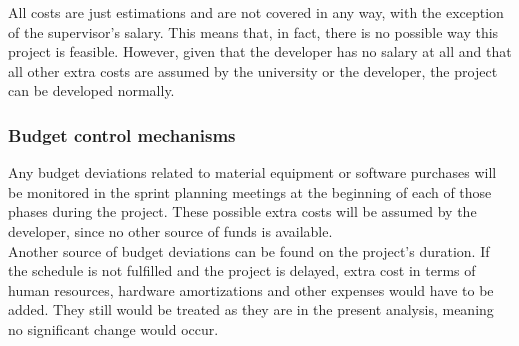 All costs are just estimations and are not covered in any way, with the exception of the supervisor’s salary. This means that, in fact, there is no possible way this project is feasible. However, given that the developer has no salary at all and that all other extra costs are assumed by the university or the developer, the project can be developed normally.

\subsubsection{Budget control mechanisms}

Any budget deviations related to material equipment or software purchases will be monitored in the sprint planning meetings at the beginning of each of those phases during the project. These possible extra costs will be assumed by the developer, since no other source of funds is available.\\

Another source of budget deviations can be found on the project’s duration. If the schedule is not fulfilled and the project is delayed, extra cost in terms of human resources, hardware amortizations and other expenses would have to be added. They still would be treated as they are in the present analysis, meaning no significant change would occur.
